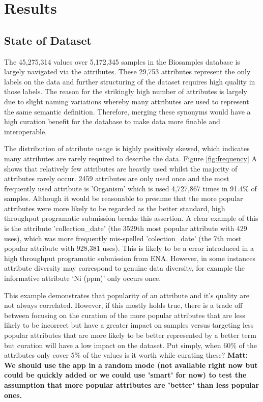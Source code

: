 \documentclass{bmcart}
\begin{document}
\section*{Results}

\subsection*{State of Dataset}

The 45,275,314 values over 5,172,345 samples in the Biosamples database is largely navigated via the attributes. These 29,753 attributes represent the only labels on the data and further structuring of the dataset requires high quality in those labels. The reason for the strikingly high number of attributes is largely due to slight naming variations whereby many attributes are used to represent the same semantic definition. Therefore, merging these synonyms would have a high curation benefit for the database to make data more finable and interoperable.

The distribution of attribute usage is highly positively skewed, which indicates many attributes are rarely required to describe the data. Figure \ref{fig:frequency} A shows that relatively few attributes are heavily used whilst the majority of attributes rarely occur. 2459 attributes are only used once and the most frequently used attribute is 'Organism' which is used 4,727,867 times in 91.4\% of samples. Although it would be reasonable to presume that the more popular attributes were more likely to be regarded as the better standard, high throughput programatic submission breaks this assertion. A clear example of this is the attribute 'collection\_date' (the 3529th most popular attribute with 429 uses), which was more frequently mis-spelled 'colection\_date' (the 7th most popular attribute with 928,381 uses). This is likely to be a error introduced in a high throughput programatic submission from ENA. However, in some instances attribute diversity may correspond to genuine data diversity, for example the informative attribute ‘Ni (ppm)’ only occurs once. 

This example demonstrates that popularity of an attribute and it's quality are not always correlated. However, if this mostly holds true, there is a trade off between focusing on the curation of the more popular attributes that are less likely to be incorrect but have a greater impact on samples versus targeting less popular attributes that are more likely to be better represented by a better term but curation will have a low impact on the dataset. Put simply, when 60\% of the attributes only cover 5\% of the values is it worth while curating these? \textbf{Matt: We should use the app in a random mode (not available right now but could be quickly added or we could use 'smart' for now) to test the assumption that more popular attributes are 'better' than less popular ones.}
\end{document}
